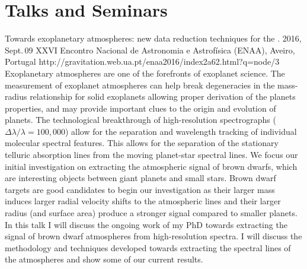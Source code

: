 \section{Talks and Seminars}\label{appsec:talks}

{Towards exoplanetary atmospheres: new data reduction techniques for the \nir{}.} %
{2016, Sept.\,09}%
{XXVI Encontro Nacional de Astronomia e Astrofísica (ENAA), Aveiro, Portugal}%
{http://gravitation.web.ua.pt/enaa2016/index2a62.html?q=node/3}%
{}%
{Exoplanetary atmospheres are one of the forefronts of exoplanet science.
The measurement of exoplanet atmospheres can help break degeneracies in the mass-radius relationship for solid exoplanets allowing proper derivation of the planets properties, and may provide important clues to the origin and evolution of planets.
The technological breakthrough of high-resolution spectrographs ($\Delta \lambda / \lambda = 100,000$) allow for the separation and wavelength tracking of individual molecular spectral features.
This allows for the separation of the stationary telluric absorption lines from the moving planet-star spectral lines.
We focus our initial investigation on extracting the atmospheric signal of brown dwarfs, which are interesting objects between giant planets and small stars.
Brown dwarf targets are good candidates to begin our investigation as their larger mass induces larger radial velocity shifts to the atmospheric lines and their larger radius (and surface area) produce a stronger signal compared to smaller planets.
In this talk I will discuss the ongoing work of my PhD towards extracting the signal of brown dwarf atmospheres from high-resolution \nir{}spectra.
I will discuss the methodology and techniques developed towards extracting the spectral lines of the atmospheres and show some of our current results.}%


